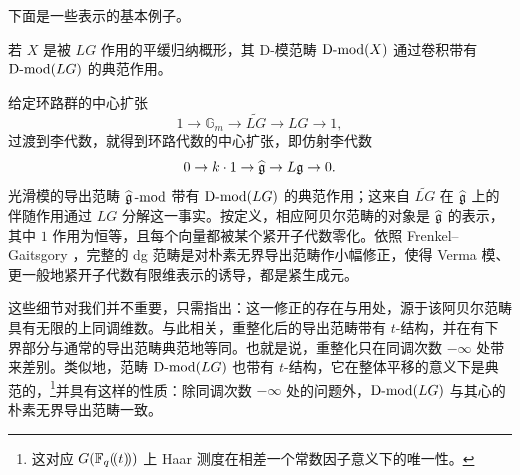 下面是一些表示的基本例子。

\begin{ex} 若 $X$ 是被 $LG$ 作用的平缓归纳概形，其 D-模范畴 $\operatorname{D-mod}(X)$ 通过卷积带有 $\operatorname{D-mod}(LG)$ 的典范作用。
\end{ex}


\begin{ex}\label{ex:kmmods} 给定环路群的中心扩张
	\[
	1 \rightarrow \mathbb{G}_m \rightarrow \widetilde{LG} \rightarrow LG
	\rightarrow 1,
	\]
	过渡到李代数，就得到环路代数的中心扩张，即仿射李代数
	\[
	 0 \rightarrow k \cdot 1 \rightarrow \widehat{\mathfrak{g}} \rightarrow L \mathfrak{g} \rightarrow
	 0.
	\]
	光滑模的导出范畴
	$
	    \widehat{\mathfrak{g}}\operatorname{-mod}
	$
	带有 $\operatorname{D-mod}(LG)$ 的典范作用；这来自 $\widetilde{LG}$ 在 $\widehat{\mathfrak{g}}$ 上的伴随作用通过 $LG$ 分解这一事实。按定义，相应阿贝尔范畴的对象是 $\widehat{\mathfrak{g}}$ 的表示，其中 $1$ 作用为恒等，且每个向量都被某个紧开子代数零化。依照 Frenkel--Gaitsgory \cite{fglocaff}，完整的 dg 范畴是对朴素无界导出范畴作小幅修正，使得 Verma 模、更一般地紧开子代数有限维表示的诱导，都是紧生成元。

	这些细节对我们并不重要，只需指出：这一修正的存在与用处，源于该阿贝尔范畴具有无限的上同调维数。与此相关，重整化后的导出范畴带有 $t$-结构，并在有下界部分与通常的导出范畴典范地等同。也就是说，重整化只在同调次数 $-\infty$ 处带来差别。类似地，范畴 $\operatorname{D-mod}(LG)$ 也带有 $t$-结构，它在整体平移的意义下是典范的，\footnote{这对应 $G(\mathbb{F}_q(\!(t)\!))$ 上 Haar 测度在相差一个常数因子意义下的唯一性。}并具有这样的性质：除同调次数 $-\infty$ 处的问题外，$\operatorname{D-mod}(LG)$ 与其心的朴素无界导出范畴一致。
\end{ex}
